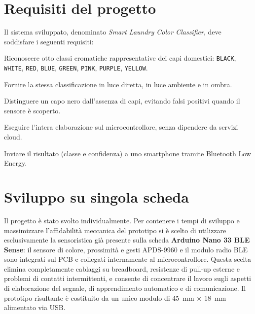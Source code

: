 \documentclass[11pt,a4paper,twoside,openany]{report}
\newenvironment{toollist}{%
  \begin{description}[
    style=nextline,
    leftmargin=0pt,
    labelindent=0pt,
    font=\normalfont\bfseries,
    itemsep=6pt
  ]
}{%
  \end{description}
}
\begin{document}
\section{Requisiti del progetto}

Il sistema sviluppato, denominato \textit{Smart Laundry Color
Classifier}, deve soddisfare i seguenti requisiti:

\begin{toollist}
  \item[R1 -- Classificazione multi-classe]
        Riconoscere otto classi cromatiche rappresentative dei capi
        domestici: \texttt{BLACK}, \texttt{WHITE}, \texttt{RED},
        \texttt{BLUE}, \texttt{GREEN}, \texttt{PINK}, \texttt{PURPLE},
        \texttt{YELLOW}.
  \item[R2 -- Robustezza all'illuminazione]
        Fornire la stessa classificazione in luce diretta, in luce
        ambiente e in ombra.
  \item[R3 -- Rilevamento della presenza]
        Distinguere un capo nero dall'assenza di capi, evitando falsi
        positivi quando il sensore è scoperto.
  \item[R4 -- Inferenza a bordo]
        Eseguire l'intera elaborazione sul microcontrollore, senza
        dipendere da servizi cloud.
  \item[R5 -- Notifica wireless]
        Inviare il risultato (classe e confidenza) a uno smartphone
        tramite Bluetooth Low Energy.
\end{toollist}

\section{Sviluppo su singola scheda}

Il progetto è stato svolto individualmente. Per contenere i tempi di
sviluppo e massimizzare l'affidabilità meccanica del prototipo si è
scelto di utilizzare esclusivamente la sensoristica già presente sulla
scheda \textbf{Arduino Nano 33 BLE Sense}: il sensore di colore,
prossimità e gesti APDS-9960 e il modulo radio BLE sono integrati sul PCB
e collegati internamente al microcontrollore. Questa scelta elimina
completamente cablaggi su breadboard, resistenze di pull-up esterne e
problemi di contatti intermittenti, e consente di concentrare il lavoro
sugli aspetti di elaborazione del segnale, di apprendimento automatico e
di comunicazione. Il prototipo risultante è costituito da un unico
modulo di \SI{45}{mm} $\times$ \SI{18}{mm} alimentato via USB.
\end{document}
